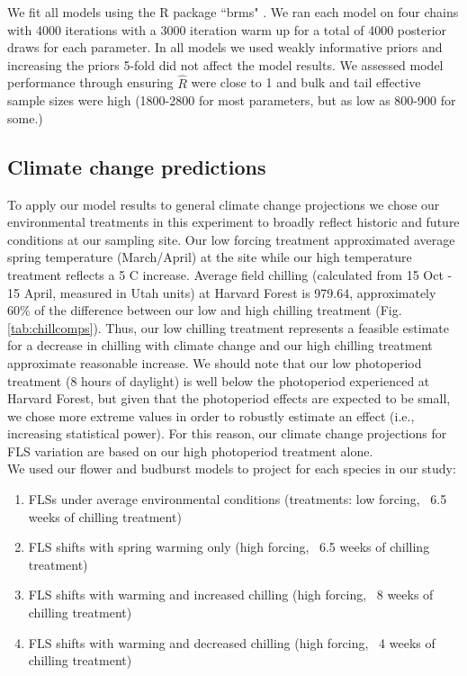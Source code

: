 \documentclass[11pt]{article}\usepackage[]{graphicx}\usepackage[]{color}
\begin{document}
\noindent We fit all models using the R package ``brms" \citep{Burkner2018}. We ran each model on four chains with 4000 iterations with a 3000 iteration warm up for a total of 4000 posterior draws for each parameter. In all models we used weakly informative priors and increasing the priors 5-fold did not affect the model results. We assessed  model performance through ensuring $\hat{R}$ were close to 1 and bulk and tail effective sample sizes were high (1800-2800 for most parameters, but as low as  800-900 for some.)\\

\subsection*{Climate change predictions}

\noindent To apply our model results to general climate change projections we chose our environmental treatments in this experiment to broadly reflect historic and future conditions at our sampling site. Our low forcing treatment approximated average spring temperature (March/April) at the site while our high temperature treatment reflects a 5 \degree C increase. Average field chilling (calculated from 15 Oct - 15 April, measured in Utah units) at Harvard Forest is 979.64, approximately 60\% of the difference between our low and high chilling treatment (Fig. \ref{tab:chillcomps}). Thus, our low chilling treatment represents a feasible estimate for a decrease in chilling with climate change and our high chilling treatment approximate reasonable increase. We should note that our low photoperiod treatment (8 hours of daylight) is well below the photoperiod experienced at Harvard Forest, but given that the photoperiod effects are expected to be small, we chose more extreme values in order to robustly estimate an effect (i.e., increasing statistical power). For this reason, our climate change projections for FLS variation are based on our high photoperiod treatment alone.\\

\noindent We used our flower and budburst models to project for each species in our study:\\
\begin{enumerate}
\item FLSs under average environmental conditions  (treatments: low forcing, ~6.5 weeks of chilling treatment)
\item FLS shifts with spring warming only (high forcing, ~6.5 weeks of chilling treatment)
\item FLS shifts with warming and increased chilling (high forcing, ~8 weeks of chilling treatment)
\item FLS shifts with warming and decreased chilling (high forcing, ~4 weeks of chilling treatment)
\end{enumerate}
\end{document}
